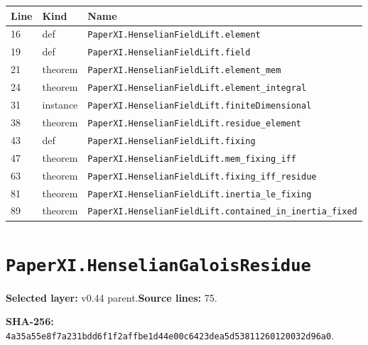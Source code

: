 \documentclass[10pt,oneside]{book}
\begin{document}
\begin{longtable}{@{}p{}p{}p{}@{}}\toprule Line&Kind&Name\\\midrule\endhead

16&def&\nolinkurl{PaperXI.HenselianFieldLift.element}\\

19&def&\nolinkurl{PaperXI.HenselianFieldLift.field}\\

21&theorem&\nolinkurl{PaperXI.HenselianFieldLift.element_mem}\\

24&theorem&\nolinkurl{PaperXI.HenselianFieldLift.element_integral}\\

31&instance&\nolinkurl{PaperXI.HenselianFieldLift.finiteDimensional}\\

38&theorem&\nolinkurl{PaperXI.HenselianFieldLift.residue_element}\\

43&def&\nolinkurl{PaperXI.HenselianFieldLift.fixing}\\

47&theorem&\nolinkurl{PaperXI.HenselianFieldLift.mem_fixing_iff}\\

63&theorem&\nolinkurl{PaperXI.HenselianFieldLift.fixing_iff_residue}\\

81&theorem&\nolinkurl{PaperXI.HenselianFieldLift.inertia_le_fixing}\\

89&theorem&\nolinkurl{PaperXI.HenselianFieldLift.contained_in_inertia_fixed}\\

\bottomrule\end{longtable}

\section{\texorpdfstring{\nolinkurl{PaperXI.HenselianGaloisResidue}}{PaperXI.HenselianGaloisResidue}}\label{module:PaperXI.HenselianGaloisResidue}

\textbf{Selected layer:} v0.44 parent.\quad\textbf{Source lines:} 75.\par\textbf{SHA-256:} {\scriptsize\nolinkurl{4a35a55e8f7a231bdd6f1f2affbe1d44e00c6423dea5d53811260120032d96a0}}.

\end{document}
